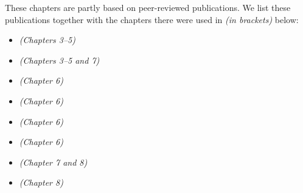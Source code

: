 \begin{description}
% 
% 
% 

% 
% 
% 
% 
% 
% 
\end{description}

These chapters are partly based on peer-reviewed publications. We list these publications together with the chapters there were used in \emph{(in brackets)} below:

\begin{itemize}
 \item %
 
\emph{ (Chapters 3--5)}
 
 \item %
\sloppy 
 \emph{(Chapters 3--5 and 7)}
 
 \item%
 
 \emph{(Chapter 6)}
 \item {}
 \emph{(Chapter 6)}
 \item
 \emph{(Chapter 6)}
 
 \item
 \emph{(Chapter 6)}
\item %
\emph{(Chapter 7 and 8)}


\item
 
 
\emph{(Chapter 8)} 
\end{itemize}


